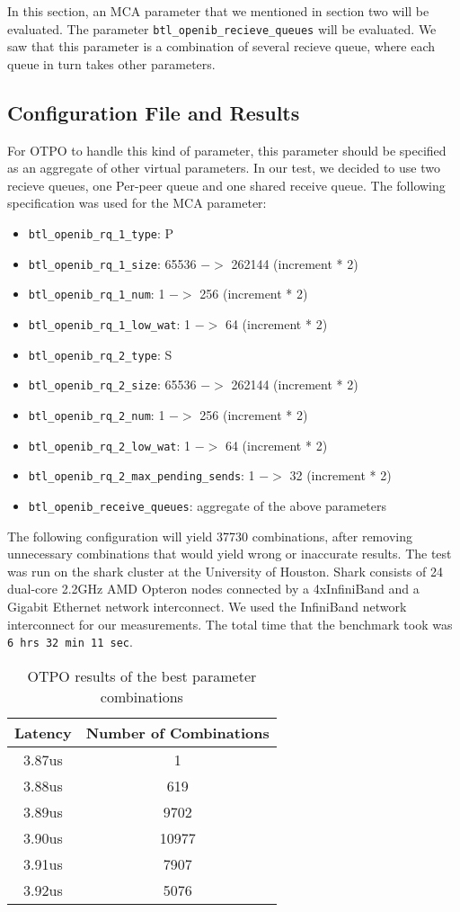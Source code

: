 In this section, an MCA parameter that we mentioned in section two will be
evaluated. The parameter {\tt btl\_openib\_recieve\_queues} will be
evaluated. We saw that this parameter is a combination of several recieve
queue, where each queue in turn takes other parameters. 

\subsection{Configuration File and Results}
For OTPO to handle this kind of parameter, this parameter should be specified
as an aggregate of other virtual parameters. In our test, we decided to use
two recieve queues, one Per-peer queue and one shared receive queue. The
following specification was used for the MCA parameter:

\begin{itemize}
\item {\tt btl\_openib\_rq\_1\_type}: P
\item {\tt btl\_openib\_rq\_1\_size}: 65536 $->$ 262144 (increment * 2)
\item {\tt btl\_openib\_rq\_1\_num}: 1 $->$ 256 (increment * 2)
\item {\tt btl\_openib\_rq\_1\_low\_wat}: 1 $->$ 64 (increment * 2)
\item {\tt btl\_openib\_rq\_2\_type}: S
\item {\tt btl\_openib\_rq\_2\_size}: 65536 $->$ 262144 (increment * 2)
\item {\tt btl\_openib\_rq\_2\_num}: 1 $->$ 256 (increment * 2)
\item {\tt btl\_openib\_rq\_2\_low\_wat}: 1 $->$ 64 (increment * 2)
\item {\tt btl\_openib\_rq\_2\_max\_pending\_sends}: 1 $->$ 32 (increment * 2)
\item {\tt btl\_openib\_receive\_queues}: aggregate of the above parameters
\end{itemize}

The following configuration will yield 37730 combinations, after removing
unnecessary combinations that would yield wrong or inaccurate results. The
test was run on the shark cluster at the University of Houston. Shark consists
of 24 dual-core 2.2GHz AMD Opteron nodes connected by a 4xInfiniBand and a
Gigabit Ethernet network interconnect. We used the InfiniBand network
interconnect for our measurements. The total time that the benchmark took was
{\tt 6 hrs 32 min 11 sec}.

\begin{table}[tb]
\centering
\begin{tabular}{|c|c|} \hline
Latency & Number of Combinations \\
\hline
3.87us  & 1\\
\hline
3.88us  & 619\\
\hline
3.89us  & 9702\\
\hline
3.90us  & 10977\\
\hline
3.91us  & 7907\\
\hline
3.92us  & 5076\\
\hline
\end{tabular}  
\caption{OTPO results of the best parameter combinations}
\label{table:results} 
\end{table}

